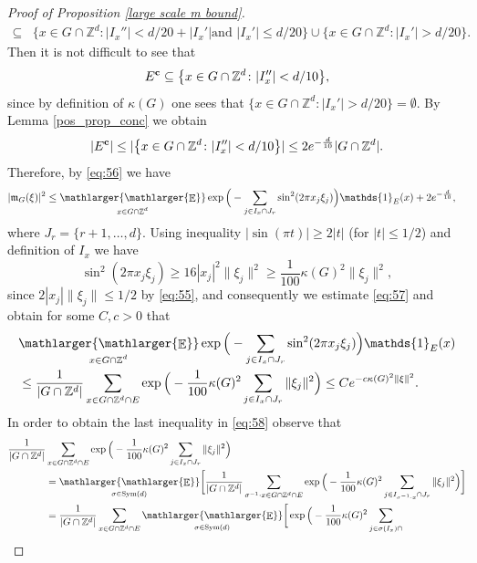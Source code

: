 \documentclass[a4paper,oneside, reqno]{amsart}
\numberwithin{equation}{section}
\theoremstyle{definition}%
\theoremstyle{definition}
\theoremstyle{definition}%
\theoremstyle{definition}
\newcommand{\E}{\mathop{\mathbb{E}}}
\newcommand{\Z}{\mathbb{Z}}
\DeclareMathOperator{\Sym}{Sym}
\newcommand{\se}[1]{\underset{_{\substack{#1}}}{\mathlarger{\mathlarger{\E}}}}
\begin{document}
\begin{proof}[Proof of Proposition \ref{large scale m bound}]
\begin{align*}
   \subseteq&\big\{x\in G\cap\Z^d\colon |I_x''|<d/20+|I_x'|\text{
     and } |I_x'|\le  d/20\big\}
  \cup
  \big\{x\in G\cap\Z^d\colon |I_x'|> d/20\big\}.
\end{align*}
Then it is not difficult to see that
\[
E^{\bf c}\subseteq \big\{x\in G\cap\Z^d\colon |I_x''|< d/10\big\},
\]
since by definition of $\kappa(G)$ one sees that $\big\{x\in G\cap\Z^d\colon |I_x'|>  d/20\big\}=\emptyset$. By Lemma \ref{pos_prop_conc} we obtain
\begin{align*}
  |E^{\bf c}|\le |\big\{x\in G\cap\Z^d\colon |I_x''|< d/10\big\}|\le 2e^{-\frac{d}{10}}|G\cap\Z^d|.
\end{align*}
Therefore, by \eqref{eq:56} we have
\begin{align}
\label{eq:57}
  \begin{split}
  |\mathfrak m_G(\xi)|^2
  &\le \se{x\in
  G\cap\Z^d}\exp\Big(-\sum_{j\in I_x\cap J_r}\sin^2(2\pi x_j
\xi_j)\Big)\mathds{1}_{E}(x)+2e^{-\frac{d}{10}},
\end{split}
\end{align}
where $J_r=\{r+1,\ldots, d\}$. Using inequality $|\sin(\pi t)| \ge 2|t|$ (for $|t| \le 1/2$) and definition of $I_x$ we have
\[
\sin^2(2\pi x_j \xi_j)\ge 16|x_j|^2\|\xi_j\|^2\ge \frac{1}{100}\kappa(G)^2\|\xi_j\|^2,
\]
since $2|x_j|\|\xi_j\|\le 1/2$ by \eqref{eq:55}, and consequently we estimate \eqref{eq:57} and obtain for some $C, c>0$ that
\begin{align}
  \label{eq:58}
  \begin{split}
  &\se{x\in
  G\cap\Z^d}\exp\Big(-\sum_{j\in I_x\cap J_r}\sin^2(2\pi x_j
  \xi_j)\Big)\mathds{1}_{E}(x)\\
  &\le
  \frac{1}{|G\cap\Z^d|}\sum_{x\in
  G\cap\Z^d\cap E}\exp\Big(-\frac{1}{100}\kappa(G)^2\sum_{j\in I_x\cap
  J_r}\|\xi_j\|^2\Big)\le Ce^{-c\kappa(G)^2\|\xi\|^2}.
  \end{split}
\end{align}
In order to obtain the last inequality in \eqref{eq:58} observe that 
\begin{align*}
\frac{1}{|G\cap\Z^d|}&\sum_{x\in G\cap\Z^d\cap E}
\exp\Big(-\frac{1}{100}\kappa(G)^2\sum_{j\in I_x\cap J_r}\|\xi_j\|^2\Big)\\
&=\se{\sigma \in \Sym(d)}\bigg[\frac{1}{|G\cap\Z^d|}\sum_{\sigma^{-1} \cdot x\in
  G\cap\Z^d\cap E}\exp\Big(-\frac{1}{100}\kappa(G)^2\sum_{j\in I_{\sigma^{-1} \cdot x}\cap
  J_r}\|\xi_j\|^2\Big)\bigg]\\
  &=\frac{1}{|G\cap\Z^d|}\sum_{x\in
  G\cap\Z^d\cap E}\se{\sigma \in \Sym(d)}\bigg[\exp\Big(-\frac{1}{100}\kappa(G)^2\sum_{j\in \sigma(I_x)\cap
}
\end{align*}
\end{proof}
\end{document}
